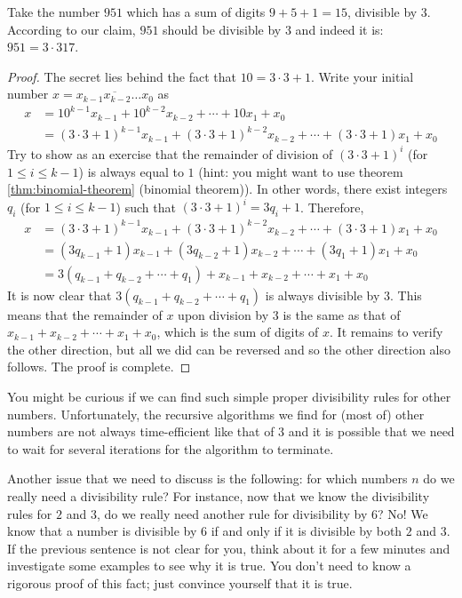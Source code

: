 \documentclass{subfile}
\begin{document}
	\begin{example}
		Take the number $951$ which has a sum of digits $9+5+1=15$, divisible by $3$. According to our claim, $951$ should be divisible by $3$ and indeed it is: $951=3\cdot317$.
	\end{example}

	\begin{proof}
		The secret lies behind the fact that $10 = 3 \cdot 3 + 1$. Write your initial number $x = \overline{x_{k-1} x_{k-2}\ldots x_0}$ as
			\begin{align*}
				x & = 10^{k-1}x_{k-1} + 10^{k-2}x_{k-2} + \cdots + 10x_1 + x_0\\
				&= (3 \cdot 3 + 1)^{k-1}x_{k-1} + (3 \cdot 3 + 1)^{k-2}x_{k-2} + \cdots + (3 \cdot 3 + 1)x_1 + x_0
			\end{align*}
		Try to show as an exercise that the remainder of division of $(3 \cdot 3 + 1)^{i}$ (for $1 \leq i \leq k-1$) is always equal to $1$ (hint: you might want to use theorem \eqref{thm:binomial-theorem} (binomial theorem)). In other words, there exist integers $q_i$ (for $1 \leq i \leq k-1$) such that $(3 \cdot 3 + 1)^{i} = 3q_i + 1$. Therefore,
			\begin{align*}
				x &= (3 \cdot 3 + 1)^{k-1}x_{k-1} + (3 \cdot 3 + 1)^{k-2}x_{k-2} + \cdots + (3 \cdot 3 + 1)x_1 + x_0\\
				&= (3q_{k-1}+1)x_{k-1} + (3q_{k-2}+1)x_{k-2} + \cdots  + (3q_{1}+1)x_{1} + x_{0}\\
				&= 3(q_{k-1} + q_{k-2} + \cdots + q_1)  + x_{k-1} + x_{k-2} + \cdots + x_1 + x_0
			\end{align*}
		It is now clear that $3(q_{k-1} + q_{k-2} + \cdots + q_1)$ is always divisible by $3$. This means that the remainder of $x$ upon division by $3$ is the same as that of $x_{k-1} + x_{k-2} + \cdots + x_1 + x_0$, which is the sum of digits of $x$. It remains to verify the other direction, but all we did can be reversed and so the other direction also follows. The proof is complete.
	\end{proof}

You might be curious if we can find such simple proper divisibility rules for other numbers. Unfortunately, the recursive algorithms we find for (most of) other numbers are not always time-efficient like that of $3$ and it is possible that we need to wait for several iterations for the algorithm to terminate.

Another issue that we need to discuss is the following: for which numbers $n$ do we really need a divisibility rule? For instance, now that we know the divisibility rules for $2$ and $3$, do we really need another rule for divisibility by $6$? No! We know that a number is divisible by $6$ if and only if it is divisible by both $2$ and $3$. If the previous sentence is not clear for you, think about it for a few minutes and investigate some examples to see why it is true. You don't need to know a rigorous proof of this fact; just convince yourself that it is true.
\end{document}
